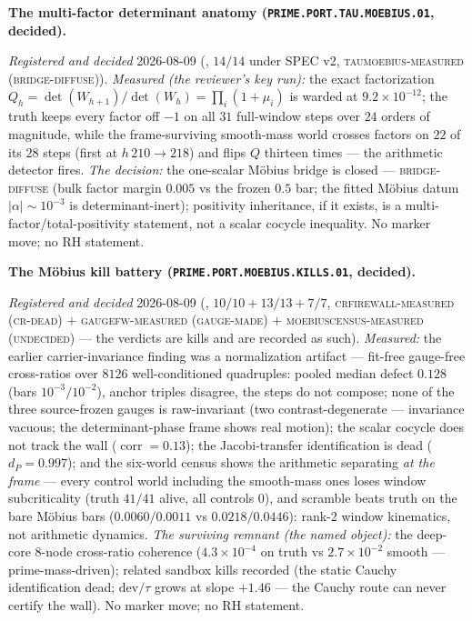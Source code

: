 \documentclass[11pt,a4paper]{article}
\begin{document}
\par\smallskip\noindent\textbf{The multi-factor determinant
anatomy (\texttt{PRIME.PORT.TAU.\allowbreak MOEBIUS.01},
decided).}
{\sloppy
\emph{Registered and decided} 2026-08-09
(, $14/14$ under SPEC
v2, \textsc{taumoebius-measured (bridge-diffuse)}).
\emph{Measured (the reviewer's key run):} the exact
factorization $Q_h = \det(W_{h+1})/\det(W_h) = \prod_i (1 +
\mu_i)$ is warded at $9.2\times10^{-12}$; the truth keeps every
factor off $-1$ on all $31$ full-window steps over $24$ orders
of magnitude, while the frame-surviving smooth-mass world
crosses factors on $22$ of its $28$ steps (first at $h\,210 \to
218$) and flips $Q$ thirteen times --- the arithmetic detector
fires.  \emph{The decision:} the one-scalar M\"obius bridge is
closed --- \textsc{bridge-diffuse} (bulk factor margin $0.005$
vs the frozen $0.5$ bar; the fitted M\"obius datum $|\alpha|
\sim 10^{-3}$ is determinant-inert); positivity inheritance, if
it exists, is a multi-factor/total-positivity statement, not a
scalar cocycle inequality.  No marker move; no RH
statement.\par}

\par\smallskip\noindent\textbf{The M\"obius kill battery
(\texttt{PRIME.PORT.MOEBIUS.\allowbreak KILLS.01}, decided).}
{\sloppy
\emph{Registered and decided} 2026-08-09
(, $10/10 + 13/13 +
7/7$, \textsc{crfirewall-measured (cr-dead)} $+$
\textsc{gaugefw-measured (gauge-made)} $+$
\textsc{moebiuscensus-measured (undecided)} --- the verdicts
are kills and are recorded as such).  \emph{Measured:} the
earlier carrier-invariance finding was a normalization artifact
--- fit-free gauge-free cross-ratios over $8126$
well-conditioned quadruples: pooled median defect $0.128$
(bars $10^{-3}/10^{-2}$), anchor triples disagree, the steps do
not compose; none of the three source-frozen gauges is
raw-invariant (two contrast-degenerate --- invariance vacuous;
the determinant-phase frame shows real motion); the scalar
cocycle does not track the wall ($\operatorname{corr} =
0.13$); the Jacobi-transfer identification is dead ($d_P =
0.997$); and the six-world census shows the arithmetic
separating \emph{at the frame} --- every control world
including the smooth-mass ones loses window subcriticality
(truth $41/41$ alive, all controls $0$), and scramble beats
truth on the bare M\"obius bars ($0.0060/0.0011$ vs
$0.0218/0.0446$): rank-2 window kinematics, not arithmetic
dynamics.  \emph{The surviving remnant (the named object):} the
deep-core $8$-node cross-ratio coherence ($4.3\times10^{-4}$ on
truth vs $2.7\times10^{-2}$ smooth --- prime-mass-driven);
related sandbox kills recorded (the static Cauchy
identification dead; $\mathrm{dev}/\tau$ grows at slope
$+1.46$ --- the Cauchy route can never certify the wall).  No
marker move; no RH statement.\par}
\end{document}
